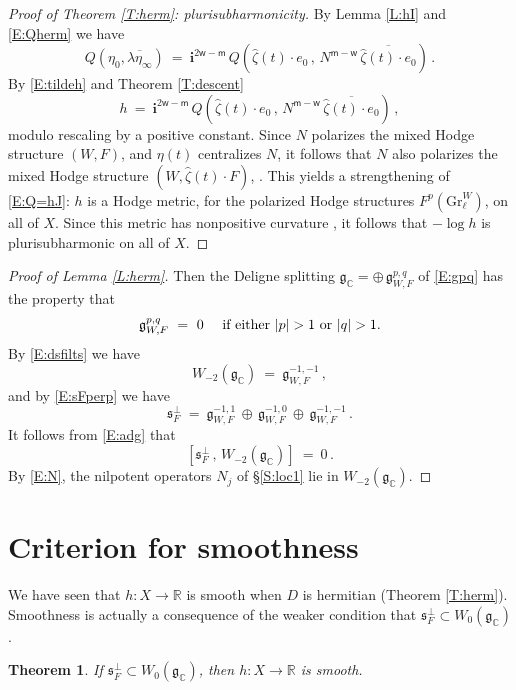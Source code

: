 \documentclass[12pt]{amsart}
\numberwithin{equation}{section}
\numberwithin{table}{section}
\def\z{\zeta}
\def\bC{\mathbb{C}}
\def\tGr{\mathrm{Gr}}
\def\fg{\mathfrak{g}}
\def\bi{\mathbf{i}}
\def\sfm{\mathsf{m}}
\def\bR{\mathbb{R}}
\def\sfw{\mathsf{w}}
\def\op{\oplus}
\newtheorem{theorem}[equation]{Theorem}
\theoremstyle{definition}
\theoremstyle{definition}
\theoremstyle{remark}
\def\fs{\mathfrak{s}}
\begin{document}
\begin{proof}[Proof of Theorem \ref{T:herm}: plurisubharmonicity]
By Lemma \ref{L:hI} and \eqref{E:Qherm} we have 
\[
  Q(\eta_0 , \overline{\lambda \eta_\infty}) \ = \ 
  \bi^{2\sfw-\sfm}\,Q \left( \hat\z(t)\cdot e_0 \,,\,
  N^{\sfm-\sfw}\,\overline {\hat\z(t)\cdot e_0} \right) \,.
\]
By \eqref{E:tildeh} and Theorem \ref{T:descent}
\[
  h \ = \ \bi^{2\sfw-\sfm}\,Q \left( \hat\z(t)\cdot e_0 \,,\,
  N^{\sfm-\sfw}\,\overline {\hat\z(t)\cdot e_0} \right) \,,
\]
modulo rescaling by a positive constant.  Since $N$ polarizes the mixed Hodge structure $(W,F)$, and $\eta(t)$ centralizes $N$, it follows that $N$ also polarizes the mixed Hodge structure $(W,\hat\z(t)\cdot F)$, \cite{MR3474815}.  This yields a strengthening of \eqref{E:Q=hJ}: $h$ is a Hodge metric, for the polarized Hodge structures $F^p(\tGr^W_\ell)$, on all of $X$.  Since this metric has nonpositive curvature \cite{MR0229641, MR0259958}, it follows that $-\log h$ is plurisubharmonic on all of $X$.
\end{proof}

\begin{proof}[Proof of Lemma \ref{L:herm}]
Then the Deligne splitting $\fg_\bC = \op\,\fg^{p,q}_{W,F}$ of \eqref{E:gpq} has the property that 
\[
  \fg^{p,q}_{W,F} \ = \ 0 
  \quad\hbox{ if either $|p| > 1$ or $|q|>1$.}
\]
By \eqref{E:dsfilts} we have 
\[
  W_{-2}(\fg_\bC) \ = \ \fg^{-1,-1}_{W,F} \,,
\]
and by \eqref{E:sFperp} we have 
\[
  \fs_F^\perp \ = \ \fg^{-1,1}_{W,F} \,\op\, \fg^{-1,0}_{W,F}
  \,\op\, \fg^{-1,-1}_{W,F} \,.
\]
It follows from \eqref{E:adg} that 
\[
  [ \fs_F^\perp \,,\, W_{-2}(\fg_\bC) ] \ = \ 0 \,.
\]
By \eqref{E:N}, the nilpotent operators $N_j$ of \S\ref{S:loc1} lie in $W_{-2}(\fg_\bC)$.   
\end{proof}

\section{Criterion for smoothness}

We have seen that $h : X \to \bR$ is smooth when $D$ is hermitian (Theorem \ref{T:herm}).  Smoothness is actually a consequence of the weaker condition that $\fs_F^\perp \subset W_0(\fg_\bC)$.

\begin{theorem} \label{T:sm}
If $\fs_F^\perp \subset W_0(\fg_\bC)$, then $h : X \to \bR$ is smooth.
\end{theorem}
\end{document}
